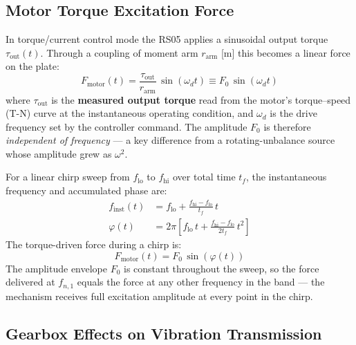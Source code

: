 \documentclass[11pt,letterpaper]{article}
\begin{document}
\subsection{Motor Torque Excitation Force}
\label{ssec:torqueexcit}

In torque/current control mode the RS05 applies a sinusoidal output torque
$\tau_{\mathrm{out}}(t)$.  Through a coupling of moment arm $r_{\mathrm{arm}}$
[m] this becomes a linear force on the plate:
\begin{equation}
  F_{\mathrm{motor}}(t) = \frac{\tau_{\mathrm{out}}}{r_{\mathrm{arm}}}\,\sin(\omega_d t)
  \equiv F_0\,\sin(\omega_d t)
  \label{eq:Ftorque}
\end{equation}
where $\tau_{\mathrm{out}}$ is the \textbf{measured output torque} read from the
motor's torque--speed (T-N) curve at the instantaneous operating condition, and
$\omega_d$ is the drive frequency set by the controller command.  The amplitude
$F_0$ is therefore \emph{independent of frequency} --- a key difference from a
rotating-unbalance source whose amplitude grew as $\omega^2$.

For a linear chirp sweep from $f_{\mathrm{lo}}$ to $f_{\mathrm{hi}}$ over total
time $t_f$, the instantaneous frequency and accumulated phase are:
\begin{align}
  f_{\mathrm{inst}}(t) &= f_{\mathrm{lo}} + \frac{f_{\mathrm{hi}} - f_{\mathrm{lo}}}{t_f}\,t
  \label{eq:finst}\\
  \varphi(t) &= 2\pi\!\left[f_{\mathrm{lo}}\,t
    + \frac{f_{\mathrm{hi}} - f_{\mathrm{lo}}}{2t_f}\,t^2\right]
  \label{eq:phi}
\end{align}
The torque-driven force during a chirp is:
\begin{equation}
  F_{\mathrm{motor}}(t) = F_0\,\sin(\varphi(t))
  \label{eq:FtorqueChirp}
\end{equation}
The amplitude envelope $F_0$ is constant throughout the sweep, so the force
delivered at $f_{n,1}$ equals the force at any other frequency in the band ---
the mechanism receives full excitation amplitude at every point in the chirp.

\subsection{Gearbox Effects on Vibration Transmission}
\label{ssec:gearbox}
\end{document}
